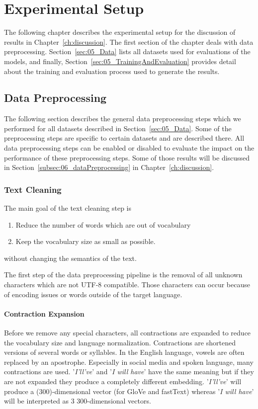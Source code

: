 \chapter{Experimental Setup}
\label{ch:setup}

The following chapter describes the experimental setup for the discussion of results in Chapter~\ref{ch:discussion}. The first section of the chapter deals with data preprocessing. Section~\ref{sec:05_Data} lists all datasets used for evaluations of the models, and finally, Section~\ref{sec:05_TrainingAndEvaluation} provides detail about the training and evaluation process used to generate the results.

\section{Data Preprocessing}
The following section describes the general data preprocessing steps which we performed for all datasets described in Section~\ref{sec:05_Data}. Some of the preprocessing steps are specific to certain datasets and are described there. All data preprocessing steps can be enabled or disabled to evaluate the impact on the performance of these preprocessing steps. Some of those results will be discussed in Section~\ref{subsec:06_dataPreprocessing} in Chapter~\ref{ch:discussion}.

\subsection{Text Cleaning}
The main goal of the text cleaning step is 
\begin{enumerate}
    \item Reduce the number of words which are out of vocabulary
    \item Keep the vocabulary size as small as possible.
\end{enumerate}

without changing the semantics of the text.


The first step of the data preprocessing pipeline is the removal of all unknown characters which are not UTF-8 compatible. Those characters can occur because of encoding issues or words outside of the target language. 
\subsubsection*{Contraction Expansion}

Before we remove any special characters, all contractions are expanded to reduce the vocabulary size and language normalization. Contractions are shortened versions of several words or syllables. In the English language, vowels are often replaced by an apostrophe.  Especially in social media and spoken language, many contractions are used. '\textit{I'll've}' and '\textit{I will have}' have the same meaning but if they are not expanded they produce a completely different embedding. '\textit{I'll've}' will produce a (300)-dimensional vector (for GloVe and fastText) whereas '\textit{I will have}' will be interpreted as 3 300-dimensional vectors.
\medskip

